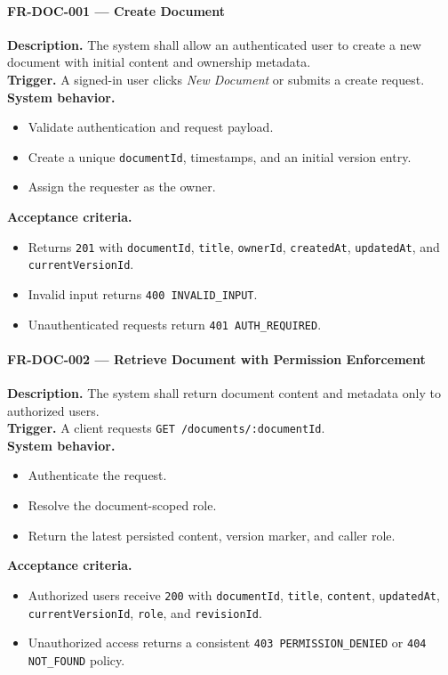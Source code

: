 \paragraph{FR-DOC-001 --- Create Document}
\textbf{Description.} The system shall allow an authenticated user to create a new document with initial
content and ownership metadata.\\
\textbf{Trigger.} A signed-in user clicks \emph{New Document} or submits a create request.\\
\textbf{System behavior.}
\begin{itemize}
  \item Validate authentication and request payload.
  \item Create a unique \texttt{documentId}, timestamps, and an initial version entry.
  \item Assign the requester as the owner.
\end{itemize}
\textbf{Acceptance criteria.}
\begin{itemize}
  \item Returns \texttt{201} with \texttt{documentId}, \texttt{title}, \texttt{ownerId}, \texttt{createdAt}, \texttt{updatedAt}, and \texttt{currentVersionId}.
  \item Invalid input returns \texttt{400 INVALID\_INPUT}.
  \item Unauthenticated requests return \texttt{401 AUTH\_REQUIRED}.
\end{itemize}

\paragraph{FR-DOC-002 --- Retrieve Document with Permission Enforcement}
\textbf{Description.} The system shall return document content and metadata only to authorized users.\\
\textbf{Trigger.} A client requests \texttt{GET /documents/:documentId}.\\
\textbf{System behavior.}
\begin{itemize}
  \item Authenticate the request.
  \item Resolve the document-scoped role.
  \item Return the latest persisted content, version marker, and caller role.
\end{itemize}
\textbf{Acceptance criteria.}
\begin{itemize}
  \item Authorized users receive \texttt{200} with \texttt{documentId}, \texttt{title}, \texttt{content}, \texttt{updatedAt}, \texttt{currentVersionId}, \texttt{role}, and \texttt{revisionId}.
  \item Unauthorized access returns a consistent \texttt{403 PERMISSION\_DENIED} or \texttt{404 NOT\_FOUND} policy.
\end{itemize}


